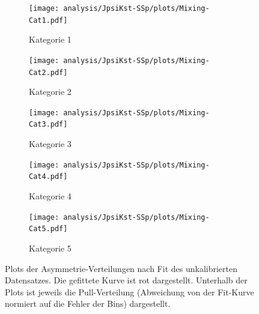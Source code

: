 \begin{figure}
        \centering
        \begin{subfigure}[b]{0.49\textwidth}
                \centering
                \texttt{[image: analysis/JpsiKst-SSp/plots/Mixing-Cat1.pdf]}
                \caption{Kategorie 1}
        \end{subfigure}
        \begin{subfigure}[b]{0.49\textwidth}
                \centering
                \texttt{[image: analysis/JpsiKst-SSp/plots/Mixing-Cat2.pdf]}
                \caption{Kategorie 2}
        \end{subfigure}

        \begin{subfigure}[b]{0.49\textwidth}
                \centering
                \texttt{[image: analysis/JpsiKst-SSp/plots/Mixing-Cat3.pdf]}
                \caption{Kategorie 3}
        \end{subfigure}
        \begin{subfigure}[b]{0.49\textwidth}
                \centering
                \texttt{[image: analysis/JpsiKst-SSp/plots/Mixing-Cat4.pdf]}
                \caption{Kategorie 4}
        \end{subfigure}

        \begin{subfigure}[b]{0.49\textwidth}
                \centering
                \texttt{[image: analysis/JpsiKst-SSp/plots/Mixing-Cat5.pdf]}
                \caption{Kategorie 5}
        \end{subfigure}
        \caption{Plots der Asymmetrie-Verteilungen nach Fit des unkalibrierten Datensatzes. Die gefittete Kurve ist rot dargestellt. Unterhalb der Plots ist jeweils die Pull-Verteilung (Abweichung von der Fit-Kurve normiert auf die Fehler der Bins) dargestellt.}
        \label{asymmetry-plots}
\end{figure}

